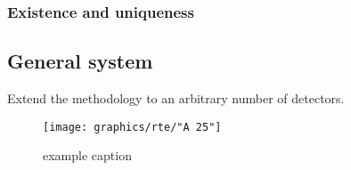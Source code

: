 \subsubsection{Existence and uniqueness}



\subsection{General system}
Extend the methodology to an arbitrary number of detectors.

\begin{figure}[htbp] 
   \centering
   \texttt{[image: graphics/rte/"A 25"]} 
   \caption{example caption}
   \label{fig:example}
\end{figure}


\endinput %